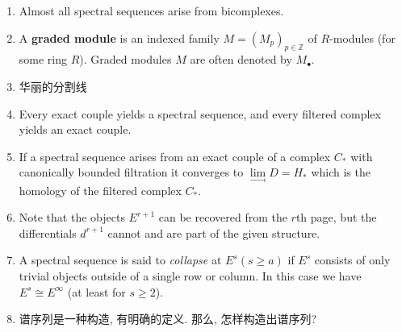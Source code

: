 \documentclass{ctexart}
\begin{document}
\begin{enumerate}
\item Almost all spectral sequences arise from bicomplexes.

\item A \textbf{graded module} is an indexed family $M = (M_p)_{p\in \mathbb{Z}}$ of $R$-modules (for some ring $R$). Graded modules $M$ are often denoted by $M_{\bullet}$.

\item 华丽的分割线

\item Every exact couple yields a spectral sequence, and every filtered complex yields an exact couple.

\item If a spectral sequence arises from an exact couple of a complex $C_*$ with canonically bounded filtration it converges to $\lim\limits_{\longrightarrow}D = H_*$ which is the homology of the filtered complex $C_*$.

\item Note that the objects $E^{r+1}$ can be recovered from the $r$th page, but the differentials $d^{r+1}$ cannot and are part of the given structure.

\item A spectral sequence is said to \textit{collapse} at $E^s(s\geq a)$ if $E^s$ consists of only trivial objects outside of a single row or column. In this case we have $E^s \cong E^{\infty}$ (at least for $s \geq 2$).

\item 谱序列是一种构造, 有明确的定义. 那么, 怎样构造出谱序列?
\end{enumerate}
\end{document}
